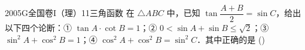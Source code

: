 
\begin{problem}{2005}{G}{全国卷I（理）}{11}{三角函数}
在 $ \triangle ABC $ 中，已知 $ \tan\dfrac{A+B}{2}=\sin C $，给出以下四个论断：① $ \tan A\cdot\cot B=1 $；② $ 0<\sin A+\sin B\leq\sqrt{2} $；③ $ \sin^2 A+\cos^2 B=1 $；④ $ \cos^2 A+\cos^2 B=\sin^2 C $．其中正确的是 (\hspace{1cm})
\begin{choices}
\end{choices}
\end{problem}

\begin{answer}

\end{answer}

\begin{solutions}

\end{solutions}